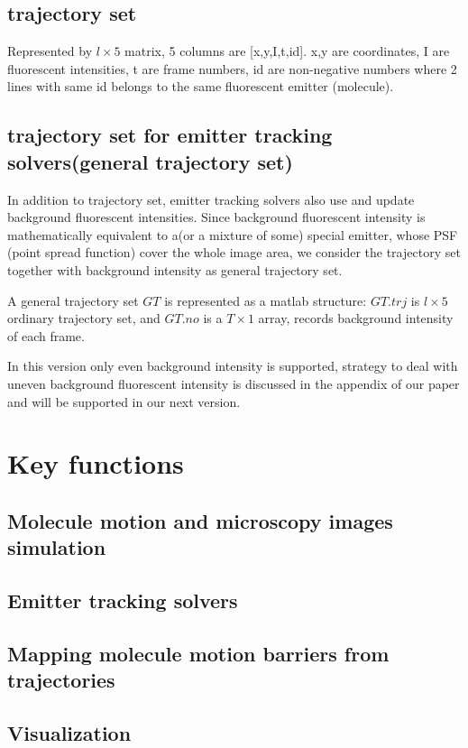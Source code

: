 \documentclass[a4paper]{article}
\begin{document}
\begin{CJK*}{UTF8}{kai}
\subsection{trajectory set}
Represented by $l\times 5$ matrix, 5 columns are [x,y,I,t,id]. x,y are coordinates, I are fluorescent intensities, t are frame numbers, id are non-negative numbers where 2 lines with same id belongs to the same fluorescent emitter (molecule).

\subsection{trajectory set for emitter tracking solvers(general trajectory set)}
In addition to trajectory set, emitter tracking solvers also use and update background fluorescent intensities. Since background fluorescent intensity is mathematically equivalent to a(or a mixture of some) special emitter, whose PSF (point spread function) cover the whole image area, we consider the trajectory set together with background intensity as general trajectory set. 

A general trajectory set $GT$ is represented as a matlab structure: $GT.trj$ is $l\times 5$ ordinary trajectory set, and $GT.no$ is a $T\times 1$ array, records background intensity of each frame.

In this version only even background intensity is supported, strategy to deal with uneven background fluorescent intensity is discussed in the appendix of our paper and will be supported in our next version.

\section{Key functions}
\subsection{Molecule motion and microscopy images simulation}

\subsection{Emitter tracking solvers}

\subsection{Mapping molecule motion barriers from trajectories}

\subsection{Visualization}


\end{CJK*}
\end{document}
